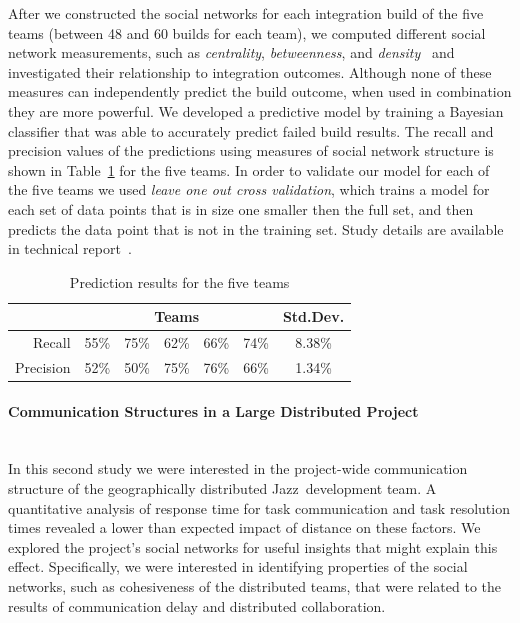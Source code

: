 \documentclass[12pt,oneside]{book}
\newcommand{\jazztm}{Jazz}
\begin{document}
After we constructed the social networks for each integration build of the five
teams
(between 48 and 60 builds for each team), we computed different social network
measurements, such as \emph{centrality}, \emph{betweenness}, and
\emph{density}~\cite{Wasserman:1994dz} and investigated their relationship to
integration outcomes. Although none of these measures can independently predict
the build outcome, when used in combination they are more powerful. We developed
a predictive model by training a
Bayesian classifier that was able to accurately predict failed build results. The
recall and precision values of the predictions using measures of social network
structure is shown in Table~\ref{tab:predictionResults} for the five teams.
In order to validate our model for each of the five teams we used \emph{leave one
out cross validation}, which trains a model for each set of data points that is
in size one smaller then the full set, and then predicts the data point that is
not in the training set. Study details are available in technical
report~\cite{wolf:tr2008}.


\begin{table}
\small
\begin{tabular}{r|c c c c c|c}
\hline
  & \multicolumn{5}{c|}{Teams} & Std.Dev. \\ \hline
Recall 		& 55\% & 75\% & 62\% & 66\% & 74\% & 8.38\% \\ 
Precision 	& 52\% & 50\% & 75\% & 76\% & 66\% & 1.34\% \\ \hline
\end{tabular}
\caption{Prediction results for the five teams}
\label{tab:predictionResults}
\end{table}





\paragraph{Communication Structures in a Large Distributed Project}
\ \\
In this second study \cite{Nguyen:2008Distance} we were interested in the
project-wide communication structure of the geographically distributed \jazztm\
development team. A quantitative analysis of response time for task
communication and task resolution times revealed a lower than expected impact of distance on these
factors. We explored the project's social networks for useful insights that might
explain this effect. Specifically, we were interested in identifying properties
of the social networks, such as cohesiveness of the distributed teams, that were
related to the results of communication delay and distributed collaboration.
\end{document}
